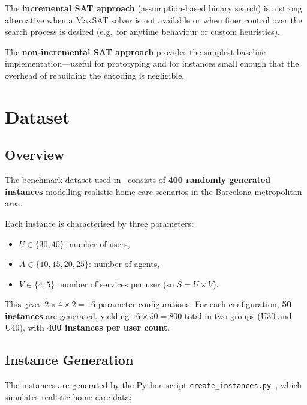 \documentclass[11pt,a4paper]{article}
\begin{document}
\noindent
The \textbf{incremental SAT approach} (assumption-based binary search) is a
strong alternative when a MaxSAT solver is not available or when finer control
over the search process is desired (e.g.\ for anytime behaviour or custom
heuristics).

\noindent
The \textbf{non-incremental SAT approach} provides the simplest baseline
implementation---useful for prototyping and for instances small enough that the
overhead of rebuilding the encoding is negligible.


\section{Dataset}\label{sec:dataset}

\subsection{Overview}

The benchmark dataset used in~\cite{collcaballero2025hcorap} consists of
\textbf{400 randomly generated instances} modelling realistic home care
scenarios in the Barcelona metropolitan area.

Each instance is characterised by three parameters:
\begin{itemize}
    \item $U \in \{30, 40\}$: number of users,
    \item $A \in \{10, 15, 20, 25\}$: number of agents,
    \item $V \in \{4, 5\}$: number of services per user (so $S = U \times V$).
\end{itemize}
This gives $2 \times 4 \times 2 = 16$ parameter configurations.
For each configuration, \textbf{50 instances} are generated, yielding
$16 \times 50 = 800$ total in two groups (U30 and U40), with \textbf{400
instances per user count}.

\subsection{Instance Generation}

The instances are generated by the Python script
\texttt{create\_instances.py}~\cite{hcorap-github}, which simulates realistic
home care data:
\end{document}
